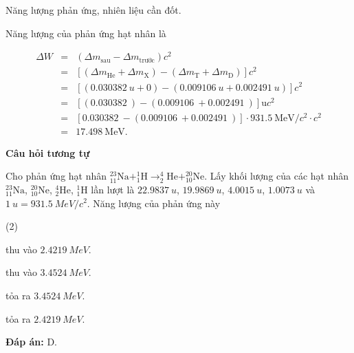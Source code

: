 \begin{dang}{Năng lượng phản ứng, nhiên liệu cần đốt.}
{		Năng lượng của phản ứng hạt nhân là
		
		\begin{eqnarray*}
			\Delta W &=& \left(\Delta m_\text{sau} - \Delta m_\text{trước}\right) c^2 \\
			&=& \left[\left(\Delta m_\text{He} + \Delta m_\text{X} \right) -  \left(\Delta m_\text{T} + \Delta m_\text{D}\right)\right] c^2\\
			&=& \left[\left(\SI{0,030382}{u} + 0 \right) -  \left(\SI{0,009106}{u} + \SI{0,002491}{u}\right)\right] c^2\\
			&=& \left[\left(\SI{0,030382}{} \right) -  \left(\SI{0,009106}{} + \SI{0,002491}{}\right)\right] \text{u} c^2\\
			&=& \left[\SI{0,030382}{}  -  \left(\SI{0,009106}{} + \SI{0,002491}{}\right)\right] \cdot\SI{931,5}{\mega\electronvolt/c^2}\cdot c^2\\
			&=&\SI{17,498}{\mega\electronvolt}.
		\end{eqnarray*}
		
		\begin{center}
			\textbf{Câu hỏi tương tự}
		\end{center}
		
		Cho phản ứng hạt nhân $^{23}_{11} \text{Na} + ^{1}_{1} \text{H} \longrightarrow ^{4}_{2} \text{He} + ^{20}_{10} \text{Ne}$. Lấy khối lượng của các hạt nhân $^{23}_{11} \text{Na}$, $^{20}_{10} \text{Ne}$, $^{4}_{2} \text{He}$, $^{1}_{1} \text{H}$ lần lượt là $\SI{22.9837}{u}$, $\SI{19.9869}{u}$, $\SI{4.0015}{u}$, $\SI{1.0073}{u}$ và $\SI{1}{u} = \SI{931.5}{MeV/c^2}$. Năng lượng của phản ứng này
		\begin{mcq}(2)
			\item thu vào $\SI{2.4219}{MeV}$.
			\item thu vào $\SI{3.4524}{MeV}$.
			\item tỏa ra $\SI{3.4524}{MeV}$.
			\item tỏa ra $\SI{2.4219}{MeV}$.
		\end{mcq}
		\textbf{Đáp án:} D.
	}
	
\end{dang}

